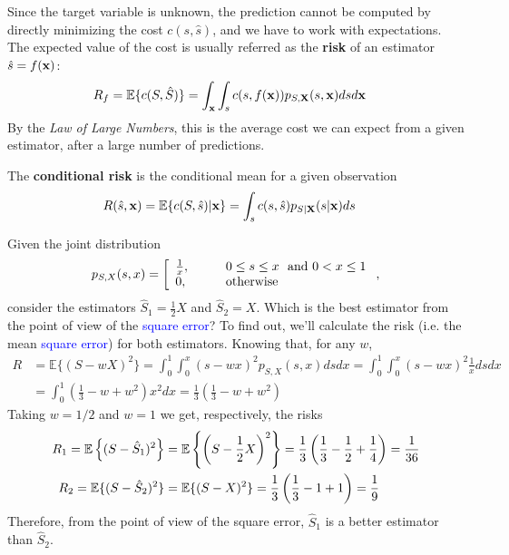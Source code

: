 Since the target variable is unknown, the prediction cannot be computed by directly minimizing the cost $c(s, \hat s)$, and we have to work with expectations. The expected value of the cost is usually referred as the {\bf risk} of an estimator $\hat{s}=f({\bf x})$:
\begin{align}
\label{Est:risk_def}
R_f = \mathbb{E}\{c(S,\hat S)\} 
    & = \int_{\bf x} \int_s c(s,f({\bf x})) p_{S,{\bf X}}(s,{\bf x}) ds d{\bf x}
\end{align}
By the \textit{Law of Large Numbers}, this is the average cost we can expect from a given estimator, after a large number of predictions.

The {\bf conditional risk} is the conditional mean for a given observation
\begin{align}
\label{Est:cond_risk}
R(\hat s, {\bf x}) = \mathbb{E}\{c(S, \hat s) |{\bf x}\} 
           & = \int_s c(s,\hat s) p_{S|{\bf X}}(s|{\bf x}) ds
\end{align}

\begin{example}
\label{CalculoECM}
Given the joint distribution
\begin{equation}
p_{S,X}(s,x) = \left[
\begin{array}{ll}
\frac{1}{x}, & \qquad 0 \le s \le x ~~{\rm and}~ 0 < x \le 1 \\
0,           & \qquad \text{otherwise}
\end{array}
\right.,
\end{equation}
consider the estimators $\hat{S}_1 = \frac{1}{2}X$ and $\hat{S}_2 = X$. Which is the best estimator from the point of view of the \textcolor{blue}{square error}? To find out, we'll calculate the risk (i.e. the mean \textcolor{blue}{square error}) for both estimators.
Knowing that, for any $w$,
\begin{align}
R &=\mathbb{E}\{(S-wX)^2\}   
   = \int_0^1 \int_0^x (s-wx)^2 p_{S,X}(s,x) ds dx   
   = \int_0^1 \int_0^x (s-wx)^2 \frac{1}{x}ds dx   \nonumber\\
  &= \int_0^1 \left(\frac{1}{3} - w  + w^2 \right) x^2 dx  
   = \frac{1}{3}\left(\frac{1}{3} - w  + w^2 \right) 
\end{align}
Taking $w=1/2$ and $w=1$ we get, respectively, the risks
\begin{align}
R_1  = \mathbb{E}\left\{(S-\hat{S}_1)^2\right\} 
	&= \mathbb{E}\left\{\left(S-\frac12 X\right)^2\right\}   
     = \frac{1}{3}\left(\frac{1}{3} - \frac{1}{2}  + \frac{1}{4} \right)
     = \frac{1}{36} \\
R_2  = \mathbb{E}\{(S-\hat{S}_2)^2\} & = \mathbb{E}\{(S-X)^2\}   
 = \frac{1}{3}\left(\frac{1}{3} - 1  + 1 \right) = \frac{1}{9}
\end{align}
Therefore, from the point of view of the square error, $\hat{S}_1$ is a better estimator than $\hat{S}_2$.
\end{example}

